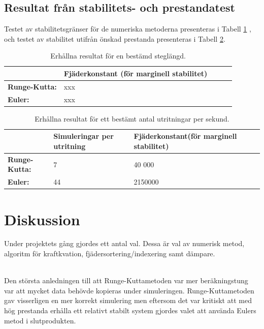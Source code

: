 \documentclass[a4paper,12pt,oneside,final,swedish]{extarticle}
\begin{document}
\subsection{Resultat från stabilitets- och prestandatest}
Testet av stabilitetsgränser för de numeriska metoderna presenteras i Tabell \ref{table_example1} , och testet av stabilitet utifrån önskad prestanda presenteras i Tabell \ref{table_example2}.
\begin{table}[htbp]
    \caption{Erhållna resultat för en bestämd steglängd.}
    \label{table_example1}
    \begin{tabular*}{\hsize}{lllll}
      \hline %
       & \bfseries Fjäderkonstant (för marginell stabilitet)\\
      \hline
      \bfseries Runge-Kutta: & xxx\\
      \bfseries Euler: & xxx\\
      \hline
    \end{tabular*}
\end{table}

\begin{table}[htbp]
    \caption{Erhållna resultat för ett bestämt antal utritningar per sekund.}
    \label{table_example2}
    \begin{tabular*}{\hsize}{lllll}
      \hline %
       & \bfseries Simuleringar per utritning & \bfseries Fjäderkonstant(för marginell stabilitet)\\
      \hline
      \bfseries Runge-Kutta: & 7 & 40 000\\
      \bfseries Euler: & 44 & 2150000\\
      \hline
    \end{tabular*}
\end{table}
\section{Diskussion}
Under projektets gång gjordes ett antal val. Dessa är val av numerisk metod, algoritm för kraftkvation, fjädersortering/indexering samt dämpare.

\noindent\\Den största anledningen till att Runge-Kuttametoden var mer beräkningstung var att mycket data behövde kopieras under simuleringen. Runge-Kuttametoden gav visserligen en mer korrekt simulering men eftersom det var kritiskt att med hög prestanda erhålla ett relativt stabilt system gjordes valet att använda Eulers metod i slutprodukten.
\end{document}
